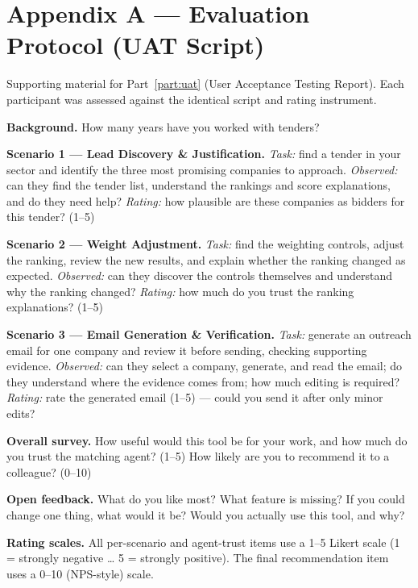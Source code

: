 \chapter*{Appendix A --- Evaluation Protocol (UAT Script)}

Supporting material for Part~\ref{part:uat} (User Acceptance Testing Report). Each
participant was assessed against the identical script and rating instrument.

\textbf{Background.} How many years have you worked with tenders?

\textbf{Scenario 1 --- Lead Discovery \& Justification.} \emph{Task:} find a tender in
your sector and identify the three most promising companies to approach.
\emph{Observed:} can they find the tender list, understand the rankings and score
explanations, and do they need help? \emph{Rating:} how plausible are these companies
as bidders for this tender? (1--5)

\textbf{Scenario 2 --- Weight Adjustment.} \emph{Task:} find the weighting controls,
adjust the ranking, review the new results, and explain whether the ranking changed as
expected. \emph{Observed:} can they discover the controls themselves and understand why
the ranking changed? \emph{Rating:} how much do you trust the ranking explanations?
(1--5)

\textbf{Scenario 3 --- Email Generation \& Verification.} \emph{Task:} generate an
outreach email for one company and review it before sending, checking supporting
evidence. \emph{Observed:} can they select a company, generate, and read the email; do
they understand where the evidence comes from; how much editing is required?
\emph{Rating:} rate the generated email (1--5) --- could you send it after only minor
edits?

\textbf{Overall survey.} How useful would this tool be for your work, and how much do
you trust the matching agent? (1--5) How likely are you to recommend it to a colleague?
(0--10)

\textbf{Open feedback.} What do you like most? What feature is missing? If you could
change one thing, what would it be? Would you actually use this tool, and why?

\textbf{Rating scales.} All per-scenario and agent-trust items use a 1--5 Likert scale
(1 = strongly negative \ldots{} 5 = strongly positive). The final recommendation item
uses a 0--10 (NPS-style) scale.
